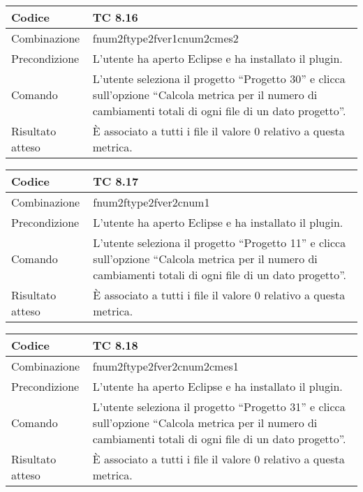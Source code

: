 \begin{table}[ht]
\begin{tabular}{|p{3cm}|p{9cm}|}
\hline
\cellcolor{lightgray}Codice				& TC 8.16								\\
\hline
\cellcolor{lightgray}Combinazione		& fnum2ftype2fver1cnum2cmes2									\\
\hline
\cellcolor{lightgray}Precondizione		& L'utente ha aperto Eclipse e ha installato il plugin.		\\
\hline
\cellcolor{lightgray}Comando			& L'utente seleziona il progetto ``Progetto 30''  e clicca sull'opzione 
``Calcola metrica per il numero di cambiamenti totali di ogni file di un dato progetto''.	\\
\hline
\cellcolor{lightgray}Risultato atteso	& È associato a tutti i file il valore 0 relativo a questa metrica.\\
\hline
\end{tabular}
\end{table}

\clearpage

\begin{table}[ht]
\begin{tabular}{|p{3cm}|p{9cm}|}
\hline
\cellcolor{lightgray}Codice				& TC 8.17								\\
\hline
\cellcolor{lightgray}Combinazione		& fnum2ftype2fver2cnum1									\\
\hline
\cellcolor{lightgray}Precondizione		& L'utente ha aperto Eclipse e ha installato il plugin.		\\
\hline
\cellcolor{lightgray}Comando			& L'utente seleziona il progetto ``Progetto 11''  e clicca sull'opzione ``Calcola metrica per il numero di cambiamenti totali di ogni file di un dato progetto''.	\\
\hline
\cellcolor{lightgray}Risultato atteso	& È associato a tutti i file il valore 0 relativo a questa metrica.\\
\hline
\end{tabular}
\end{table}

\begin{table}[ht]
\begin{tabular}{|p{3cm}|p{9cm}|}
\hline
\cellcolor{lightgray}Codice				& TC 8.18								\\
\hline
\cellcolor{lightgray}Combinazione		& fnum2ftype2fver2cnum2cmes1									\\
\hline
\cellcolor{lightgray}Precondizione		& L'utente ha aperto Eclipse e ha installato il plugin.		\\
\hline
\cellcolor{lightgray}Comando			& L'utente seleziona il progetto ``Progetto 31''  e clicca sull'opzione ``Calcola metrica per il numero di cambiamenti totali di ogni file di un dato progetto''.	\\
\hline
\cellcolor{lightgray}Risultato atteso	& È associato a tutti i file il valore 0 relativo a questa metrica.\\
\hline
\end{tabular}
\end{table}


